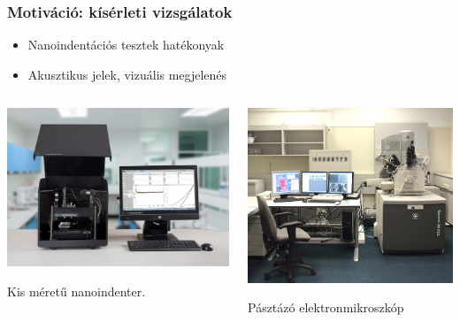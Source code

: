 \documentclass[12pt]{beamer}
\begin{document}
\begin{frame}
\frametitle{Motiváció: kísérleti vizsgálatok}
\begin{itemize}
\item Nanoindentációs tesztek hatékonyak
\item Akusztikus jelek, vizuális megjelenés
\end{itemize}
\begin{columns}
\begin{column}{0.51\textwidth}
  \begin{center}
  \includegraphics[width=1\textwidth]{figs/newnanopicture.jpg}
  \end{center}
 Kis méretű nanoindenter.
\end{column}
\begin{column}{0.5\textwidth}  %
  \begin{center}
  \includegraphics[width=1\textwidth]{figs/SEM-laboratorium.jpg}
  \end{center}
Pásztázó elektronmikroszkóp
\end{column}
\end{columns}
\end{frame}
\end{document}
